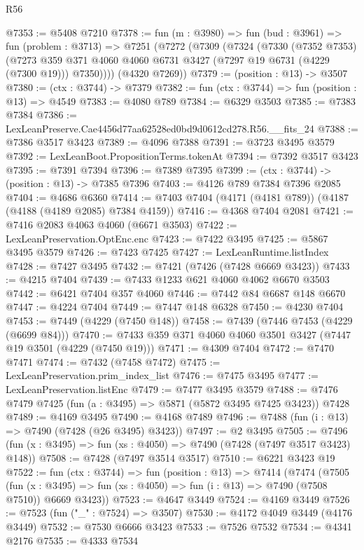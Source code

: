\begin{lexlean}{R56}
\begin{coremodule}
@7353 := @5408 @7210
@7378 := fun (m : @3980) =>
  fun (bud : @3961) =>
  fun (problem : @3713) =>
  @7251
    (@7272
      (@7309
        (@7324
          (@7330
            (@7352 @7353)
            (@7273 @359 @371 @4060 @4060 @6731 @3427 (@7297 @19 @6731 (@4229 (@7300 @19))) @7350))))
      (@4320 @7269))
@7379 := (position : @13) -> @3507
@7380 := (ctx : @3744) -> @7379
@7382 := fun (ctx : @3744) => fun (position : @13) => @4549
@7383 := @4080 @789
@7384 := @6329 @3503
@7385 := @7383 @7384
@7386 := LexLeanPreserve.Cae4456d77aa62528ed0bd9d0612cd278.R56.__fits_24
@7388 := @7386 @3517 @3423
@7389 := @4096 @7388
@7391 := @3723 @3495 @3579
@7392 := LexLeanBoot.PropositionTerms.tokenAt
@7394 := @7392 @3517 @3423
@7395 := @7391 @7394
@7396 := @7389 @7395
@7399 := (ctx : @3744) -> (position : @13) -> @7385 @7396
@7403 := @4126 @789 @7384 @7396 @2085
@7404 := @4686 @6360
@7414 := @7403 @7404 (@4171 (@4181 @789)) (@4187 (@4188 (@4189 @2085) @7384 @4159))
@7416 := @4368 @7404 @2081
@7421 := @7416 @2083 @4063 @4060 (@6671 @3503)
@7422 := LexLeanPreservation.OptEnc.enc
@7423 := @7422 @3495
@7425 := @5867 @3495 @3579
@7426 := @7423 @7425
@7427 := LexLeanRuntime.listIndex
@7428 := @7427 @3495
@7432 := @7421 (@7426 (@7428 @6669 @3423))
@7433 := @4215 @7404
@7439 := @7433 @1233 @621 @4060 @4062 @6670 @3503
@7442 := @6421 @7404 @357 @4060
@7446 := @7442 @84 @6687 @148 @6670
@7447 := @4224 @7404
@7449 := @7447 @148 @6328
@7450 := @4230 @7404
@7453 := @7449 (@4229 (@7450 @148))
@7458 := @7439 (@7446 @7453 (@4229 (@6699 @84)))
@7470 := @7433 @359 @371 @4060 @4060 @3501 @3427 (@7447 @19 @3501 (@4229 (@7450 @19)))
@7471 := @4309 @7404
@7472 := @7470 @7471
@7474 := @7432 (@7458 @7472)
@7475 := LexLeanPreservation.prim_index_list
@7476 := @7475 @3495
@7477 := LexLeanPreservation.listEnc
@7479 := @7477 @3495 @3579
@7488 := @7476 @7479 @7425 (fun (a : @3495) => @5871 (@5872 @3495 @7425 @3423)) @7428
@7489 := @4169 @3495
@7490 := @4168 @7489
@7496 := @7488 (fun (i : @13) => @7490 (@7428 (@26 @3495) @3423))
@7497 := @2 @3495
@7505 := @7496 (fun (x : @3495) => fun (xs : @4050) => @7490 (@7428 (@7497 @3517 @3423) @148))
@7508 := @7428 (@7497 @3514 @3517)
@7510 := @6221 @3423 @19
@7522 := fun (ctx : @3744) =>
  fun (position : @13) =>
  @7414
    (@7474
      (@7505
        (fun (x : @3495) => fun (xs : @4050) => fun (i : @13) => @7490 (@7508 @7510))
        @6669
        @3423))
@7523 := @4647 @3449
@7524 := @4169 @3449
@7526 := @7523 (fun ("_" : @7524) => @3507)
@7530 := @4172 @4049 @3449 (@4176 @3449)
@7532 := @7530 @6666 @3423
@7533 := @7526 @7532
@7534 := @4341 @2176
@7535 := @4333 @7534

\end{coremodule}
\end{lexlean}
